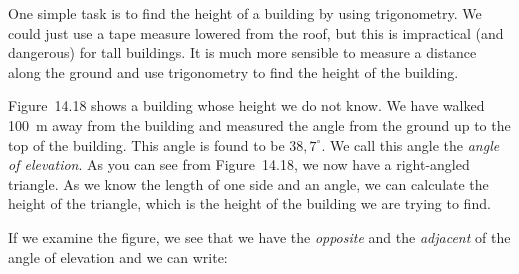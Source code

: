         \label{m39411*id81653}One simple task is to find the height of a building by using trigonometry. We could just use a tape measure lowered from the roof, but this is impractical (and dangerous) for tall buildings. It is much more sensible to measure a distance along the ground and use trigonometry to find the height of the building.\par 
        \label{m39411*id81658}Figure~14.18 shows a building whose height we do not know. We have walked 100~m away from the building and measured the angle from the ground up to the top of the building. This angle is found to be \begin{math}38,{7}^{\circ }\end{math}. We call this angle the \textsl{angle of elevation}. As you can see from Figure~14.18, we now have a right-angled triangle. As we know the length of one side and an angle, we can calculate the height of the triangle, which is the height of the building we are trying to find.\par 
        \label{m39411*id81702}If we examine the figure, we see that we have the \textsl{opposite} and the \textsl{adjacent} of the angle of elevation and we can write:\par 
        \label{m39411*id81717}\nopagebreak\noindent{}
